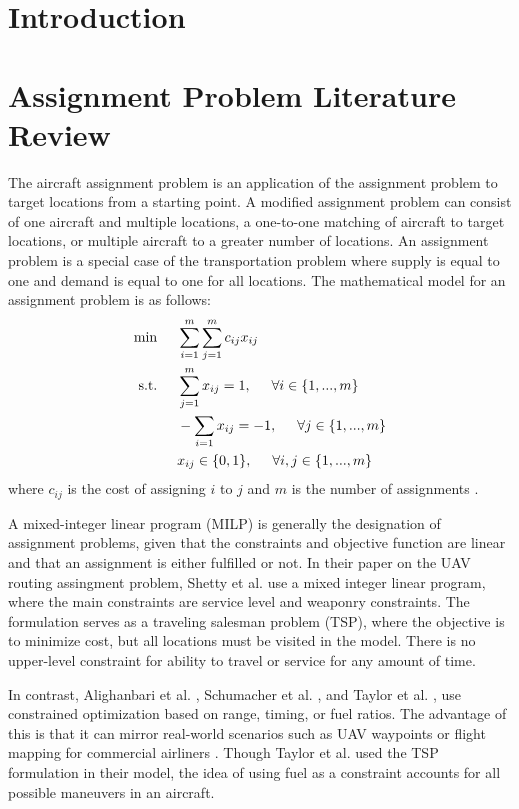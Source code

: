 \section{Introduction}
\section{Assignment Problem Literature Review}
The aircraft assignment problem is an application of the assignment problem to target locations from a starting point. A modified assignment problem can consist of one aircraft and multiple locations, a one-to-one matching of aircraft to target locations, or multiple aircraft to a greater number of locations. An assignment problem is a special case of the transportation problem where supply is equal to one and demand is equal to one for all locations. The mathematical model for an assignment problem is as follows:
\begin{align*}
    \min\hspace{0.5cm} &\sum_{i=1}^m\sum_{j = 1}^mc_{ij}x_{ij}\\
    \text{s.t.} \hspace{0.5cm} &\sum_{j=1}^mx_{ij} = 1, \hspace{0.5cm} \forall i \in \{1,...,m\}\\
    &-\sum_{i=1}x_{ij} = -1, \hspace{0.5cm} \forall j \in \{1,...,m\}\\
    &x_{ij} \in \{0,1\}, \hspace{0.5cm} \forall i,j\in \{1,...,m\}
\end{align*}
where $c_{ij}$ is the cost of assigning $i$ to $j$ and $m$ is the number of assignments \cite{bazaraa}. 
\par
A mixed-integer linear program (MILP) is generally the designation of assignment problems, given that the constraints and objective function are linear and that an assignment is either fulfilled or not. In their paper on the UAV routing assingment problem, Shetty et al. \cite{Shetty} use a mixed integer linear program, where the main constraints are service level and weaponry constraints. The formulation serves as a traveling salesman problem (TSP), where the objective is to minimize cost, but all locations must be visited in the model. There is no upper-level constraint for ability to travel or service for any amount of time.\par
In contrast, Alighanbari et al. \cite{Alighanbari}, Schumacher et al. \cite{Schumacher}, and Taylor et al. \cite{Taylor}, use constrained optimization based on range, timing, or fuel ratios. The advantage of this is that it can mirror real-world scenarios such as UAV waypoints \cite{Alighanbari} or flight mapping for commercial airliners \cite{Taylor}. Though Taylor et al. \cite{Taylor} used the TSP formulation in their model, the idea of using fuel as a constraint accounts for all possible maneuvers in an aircraft.\par
